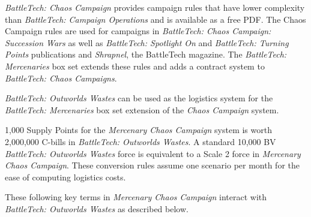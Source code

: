 \emph{BattleTech: Chaos Campaign} provides campaign rules that have lower complexity than \emph{BattleTech: Campaign Operations} and is available as a free PDF.
The Chaos Campaign rules are used for campaigns in \emph{BattleTech: Chaos Campaign: Succession Wars} as well as \emph{BattleTech: Spotlight On} and \emph{BattleTech: Turning Points} publications and \emph{Shrapnel}, the BattleTech magazine.
The \emph{BattleTech: Mercenaries} box set extends these rules and adds a contract system to \emph{BattleTech: Chaos Campaigns}.

\emph{BattleTech: Outworlds Wastes} can be used as the logistics system for the \emph{BattleTech: Mercenaries} box set extension of the \emph{Chaos Campaign} system.

1,000 Supply Points for the \emph{Mercenary Chaos Campaign} system is worth 2,000,000 C-bills in \emph{BattleTech: Outworlds Wastes}.
A standard 10,000 BV \emph{BattleTech: Outworlds Wastes} force is equivalent to a Scale 2 force in \emph{Mercenary Chaos Campaign}.
These conversion rules assume one scenario per month for the ease of computing logistics costs.

These following key terms in \emph{Mercenary Chaos Campaign} interact with \emph{BattleTech: Outworlds Wastes} as described below.


